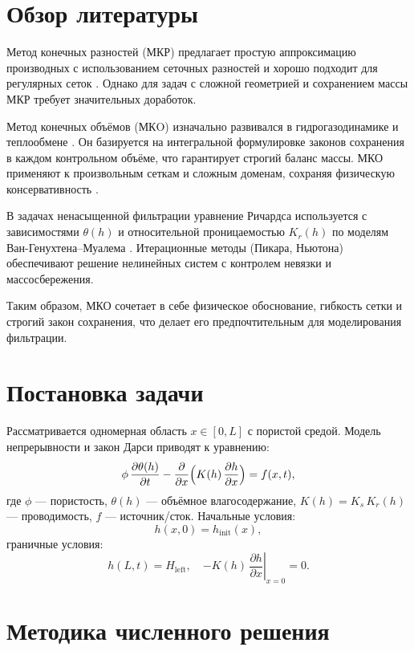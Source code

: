 \documentclass[a4paper,12pt]{article}
\begin{document}
\section{Обзор литературы}
Метод конечных разностей (МКР) предлагает простую аппроксимацию производных с использованием сеточных разностей и хорошо подходит для регулярных сеток \cite{Samarskii1989}. Однако для задач с сложной геометрией и сохранением массы МКР требует значительных доработок. 

Метод конечных объёмов (МКO) изначально развивался в гидрогазодинамике и теплообмене \cite{Bear1972}. Он базируется на интегральной формулировке законов сохранения в каждом контрольном объёме, что гарантирует строгий баланс массы. МКО применяют к произвольным сеткам и сложным доменам, сохраняя физическую консервативность \cite{Leontiev2017}.

В задачах ненасыщенной фильтрации уравнение Ричардса используется с зависимостями $\theta(h)$ и относительной проницаемостью $K_r(h)$ по моделям Ван-Генухтена–Муалема \cite{VanGenuchten1980,Celia1990}. Итерационные методы (Пикара, Ньютона) обеспечивают решение нелинейных систем с контролем невязки и массосбережения.

Таким образом, МКО сочетает в себе физическое обоснование, гибкость сетки и строгий закон сохранения, что делает его предпочтительным для моделирования фильтрации.

\section{Постановка задачи}
Рассматривается одномерная область $x\in[0,L]$ с пористой средой. Модель непрерывности и закон Дарси приводят к уравнению:
\begin{equation}
\phi\,\frac{\partial \theta(h)}{\partial t}
-
\frac{\partial}{\partial x}
\Bigl(K(h)\,\frac{\partial h}{\partial x}\Bigr)
= f(x,t),
\end{equation}
где $\phi$ — пористость, $\theta(h)$ — объёмное влагосодержание, $K(h)=K_s\,K_r(h)$ — проводимость, $f$ — источник/сток. Начальные условия:
\[
h(x,0) = h_{\mathrm{init}}(x),
\]
граничные условия:
\[
h(L,t)=H_{\mathrm{left}},\quad
\left.-K(h)\,\frac{\partial h}{\partial x}\right|_{x=0}=0.
\]

\section{Методика численного решения}
\end{document}
